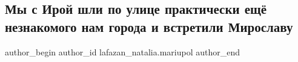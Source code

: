  
 
 
 
 

\subsection{Мы с Ирой шли по улице практически ещё незнакомого нам города и встретили Мирославу}
\label{sec:10_01_2023.fb.lafazan_natalia.mariupol.1.miroslava}

\ifcmt
 author_begin
   author_id lafazan_natalia.mariupol
 author_end
\fi

